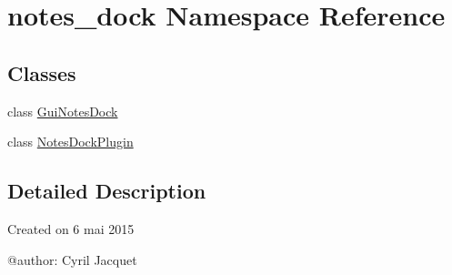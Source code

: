 \hypertarget{namespacenotes__dock}{}\section{notes\+\_\+dock Namespace Reference}
\label{namespacenotes__dock}
\subsection*{Classes}
\begin{DoxyCompactItemize}
\item 
class \hyperlink{classnotes__dock_1_1_gui_notes_dock}{Gui\+Notes\+Dock}
\item 
class \hyperlink{classnotes__dock_1_1_notes_dock_plugin}{Notes\+Dock\+Plugin}
\end{DoxyCompactItemize}


\subsection{Detailed Description}
\begin{DoxyVerb}Created on 6 mai 2015

@author:  Cyril Jacquet
\end{DoxyVerb}
 